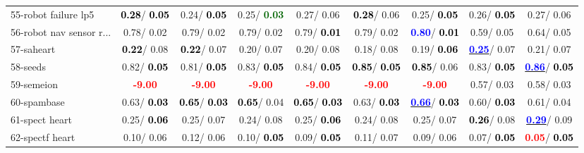 \begin{table}[h]
\begin{center}
\begin{tabular}{lc|c|c|c|c|c|c|c}
55-robot failure lp5 & \textcolor{black}{\textbf{  0.28}}/\textcolor{black}{\textbf{  0.05}} &   0.24/\textcolor{black}{\textbf{  0.05}} &   0.25/\textcolor{darkgreen}{\textbf{  0.03}} &   0.27/  0.06 & \textcolor{black}{\textbf{  0.28}}/  0.06 &   0.25/\textcolor{black}{\textbf{  0.05}} &   0.26/\textcolor{black}{\textbf{  0.05}} &   0.27/  0.06 \\
56-robot nav sensor r... &   0.78/  0.02 &   0.79/  0.02 &   0.79/  0.02 &   0.79/\textcolor{black}{\textbf{  0.01}} &   0.79/  0.02 & \textcolor{blue}{\textbf{  0.80}}/\textcolor{black}{\textbf{  0.01}} &   0.59/  0.05 &   0.64/  0.05 \\
57-saheart & \textcolor{black}{\textbf{  0.22}}/  0.08 & \textcolor{black}{\textbf{  0.22}}/  0.07 &   0.20/  0.07 &   0.20/  0.08 &   0.18/  0.08 &   0.19/\textcolor{black}{\textbf{  0.06}} & \underline{\textcolor{blue}{\textbf{  0.25}}}/  0.07 &   0.21/  0.07 \\
58-seeds &   0.82/\textcolor{black}{\textbf{  0.05}} &   0.81/\textcolor{black}{\textbf{  0.05}} &   0.83/\textcolor{black}{\textbf{  0.05}} &   0.84/\textcolor{black}{\textbf{  0.05}} & \textcolor{black}{\textbf{  0.85}}/\textcolor{black}{\textbf{  0.05}} & \textcolor{black}{\textbf{  0.85}}/  0.06 &   0.83/\textcolor{black}{\textbf{  0.05}} & \underline{\textcolor{blue}{\textbf{  0.86}}}/\textcolor{black}{\textbf{  0.05}} \\
59-semeion & \textcolor{red}{\textbf{ -9.00}} & \textcolor{red}{\textbf{ -9.00}} & \textcolor{red}{\textbf{ -9.00}} & \textcolor{red}{\textbf{ -9.00}} & \textcolor{red}{\textbf{ -9.00}} & \textcolor{red}{\textbf{ -9.00}} &   0.57/  0.03 &   0.58/  0.03 \\
60-spambase &   0.63/\textcolor{black}{\textbf{  0.03}} & \textcolor{black}{\textbf{  0.65}}/\textcolor{black}{\textbf{  0.03}} & \textcolor{black}{\textbf{  0.65}}/  0.04 & \textcolor{black}{\textbf{  0.65}}/\textcolor{black}{\textbf{  0.03}} &   0.63/\textcolor{black}{\textbf{  0.03}} & \underline{\textcolor{blue}{\textbf{  0.66}}}/\textcolor{black}{\textbf{  0.03}} &   0.60/\textcolor{black}{\textbf{  0.03}} &   0.61/  0.04 \\ \hline
61-spect heart &   0.25/\textcolor{black}{\textbf{  0.06}} &   0.25/  0.07 &   0.24/  0.08 &   0.25/\textcolor{black}{\textbf{  0.06}} &   0.24/  0.08 &   0.25/  0.07 & \textcolor{black}{\textbf{  0.26}}/  0.08 & \underline{\textcolor{blue}{\textbf{  0.29}}}/  0.09 \\
62-spectf heart &   0.10/  0.06 &   0.12/  0.06 &   0.10/\textcolor{black}{\textbf{  0.05}} &   0.09/\textcolor{black}{\textbf{  0.05}} &   0.11/  0.07 &   0.09/  0.06 &   0.07/\textcolor{black}{\textbf{  0.05}} & \textcolor{red}{\textbf{  0.05}}/\textcolor{black}{\textbf{  0.05}} \\

\end{tabular}
\end{center}
\end{table}
